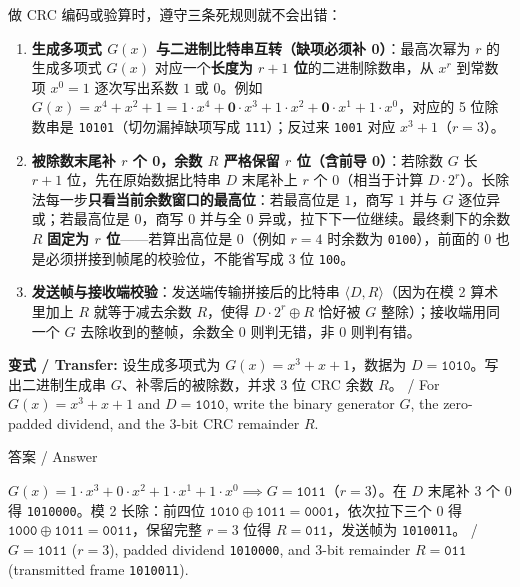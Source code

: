 做 CRC 编码或验算时，遵守三条死规则就不会出错：
\begin{enumerate}[start=1]
\item \textbf{生成多项式 \(G(x)\) 与二进制比特串互转（缺项必须补 0）}：最高次幂为 \(r\) 的生成多项式 \(G(x)\) 对应一个\textbf{长度为 \(r + 1\) 位}的二进制除数串，从 \(x^r\) 到常数项 \(x^0 = 1\) 逐次写出系数 \(1\) 或 \(0\)。例如 \(G(x) = x^4 + x^2 + 1 = 1\cdot x^4 + \mathbf{0}\cdot x^3 + 1\cdot x^2 + \mathbf{0}\cdot x^1 + 1\cdot x^0\)，对应的 5 位除数串是 \texttt{10101}（切勿漏掉缺项写成 \texttt{111}）；反过来 \texttt{1001} 对应 \(x^3 + 1\)（\(r = 3\)）。
\item \textbf{被除数末尾补 \(r\) 个 0，余数 \(R\) 严格保留 \(r\) 位（含前导 0）}：若除数 \(G\) 长 \(r + 1\) 位，先在原始数据比特串 \(D\) 末尾补上 \(r\) 个 \(0\)（相当于计算 \(D\cdot 2^r\)）。长除法每一步\textbf{只看当前余数窗口的最高位}：若最高位是 \(1\)，商写 \(1\) 并与 \(G\) 逐位异或；若最高位是 \(0\)，商写 \(0\) 并与全 \(0\) 异或，拉下下一位继续。最终剩下的余数 \(R\) \textbf{固定为 \(r\) 位}——若算出高位是 \(0\)（例如 \(r=4\) 时余数为 \texttt{0100}），前面的 \(0\) 也是必须拼接到帧尾的校验位，不能省写成 3 位 \texttt{100}。
\item \textbf{发送帧与接收端校验}：发送端传输拼接后的比特串 \(\langle D, R\rangle\)（因为在模 2 算术里加上 \(R\) 就等于减去余数 \(R\)，使得 \(D\cdot 2^r \oplus R\) 恰好被 \(G\) 整除）；接收端用同一个 \(G\) 去除收到的整帧，余数全 \(0\) 则判无错，非 \(0\) 则判有错。
\end{enumerate}


\textbf{变式 / Transfer:} 设生成多项式为 \(G(x) = x^3 + x + 1\)，数据为 \(D = \mathtt{1010}\)。写出二进制生成串 \(G\)、补零后的被除数，并求 3 位 CRC 余数 \(R\)。 / For \(G(x) = x^3 + x + 1\) and \(D = \mathtt{1010}\), write the binary generator \(G\), the zero-padded dividend, and the 3-bit CRC remainder \(R\).



\begin{StudySolution}{答案 / Answer}


\(G(x) = 1\cdot x^3 + 0\cdot x^2 + 1\cdot x^1 + 1\cdot x^0 \implies G = \mathtt{1011}\)（\(r = 3\)）。在 \(D\) 末尾补 3 个 0 得 \texttt{1010000}。模 2 长除：前四位 \(\mathtt{1010}\oplus\mathtt{1011}=\mathtt{0001}\)，依次拉下三个 0 得 \(\mathtt{1000}\oplus\mathtt{1011}=\mathtt{0011}\)，保留完整 \(r = 3\) 位得 \(R = \mathtt{011}\)，发送帧为 \texttt{1010011}。 / \(G = \mathtt{1011}\) (\(r=3\)), padded dividend \texttt{1010000}, and 3-bit remainder \(R = \mathtt{011}\) (transmitted frame \texttt{1010011}).


\end{StudySolution}


